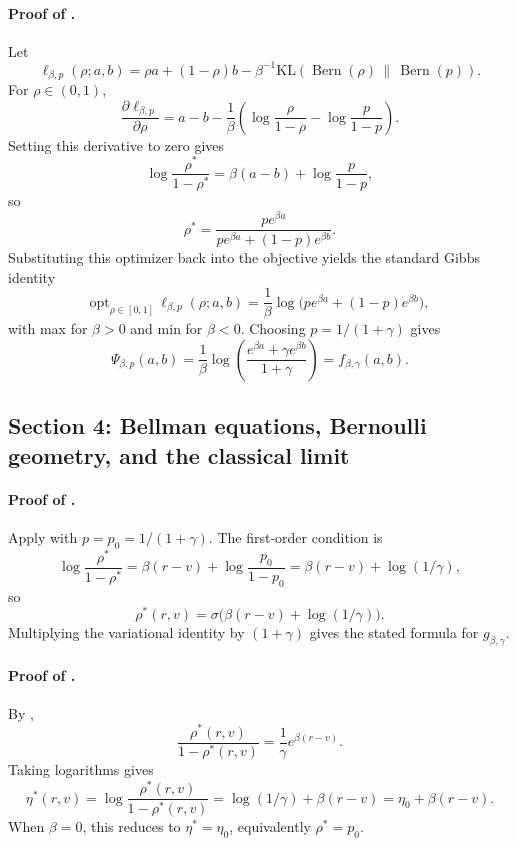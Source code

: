 \documentclass{article}
\theoremstyle{remark}
\DeclareMathOperator{\Bern}{Bern}
\newcommand{\KL}{\mathrm{KL}}
\newcommand{\pprior}{p_0}
\begin{document}
\paragraph{Proof of .}
Let
\[
\ell_{\beta,p}(\rho;a,b)=\rho a +(1-\rho)b-\beta^{-1}\KL\!\left(\Bern(\rho)\,\middle\|\,\Bern(p)\right).
\]
For $\rho\in(0,1)$,
\[
\frac{\partial \ell_{\beta,p}}{\partial \rho}
=a-b-\frac{1}{\beta}\left(\log\frac{\rho}{1-\rho}-\log\frac{p}{1-p}\right).
\]
Setting this derivative to zero gives
\[
\log\frac{\rho^*}{1-\rho^*}=\beta(a-b)+\log\frac{p}{1-p},
\]
so
\[
\rho^*=\frac{pe^{\beta a}}{pe^{\beta a}+(1-p)e^{\beta b}}.
\]
Substituting this optimizer back into the objective yields the standard Gibbs identity
\[
\mathrm{opt}_{\rho\in[0,1]}\,\ell_{\beta,p}(\rho;a,b)
=\frac{1}{\beta}\log\bigl(pe^{\beta a}+(1-p)e^{\beta b}\bigr),
\]
with \textnormal{max} for $\beta>0$ and \textnormal{min} for $\beta<0$.
Choosing $p=1/(1+\gamma)$ gives
\[
\Psi_{\beta,p}(a,b)=\frac{1}{\beta}\log\!\left(\frac{e^{\beta a}+\gamma e^{\beta b}}{1+\gamma}\right)=f_{\beta,\gamma}(a,b).
\]

\subsection{Section 4: Bellman equations, Bernoulli geometry, and the classical limit}
\label{app:bellman}

\paragraph{Proof of .}
Apply  with $p=\pprior=1/(1+\gamma)$.
The first-order condition is
\[
\log\frac{\rho^*}{1-\rho^*}=\beta(r-v)+\log\frac{\pprior}{1-\pprior}=\beta(r-v)+\log(1/\gamma),
\]
so
\[
\rho^*(r,v)=\sigma\!\bigl(\beta(r-v)+\log(1/\gamma)\bigr).
\]
Multiplying the variational identity by $(1+\gamma)$ gives the stated formula for $g_{\beta,\gamma}$.

\paragraph{Proof of .}
By ,
\[
\frac{\rho^*(r,v)}{1-\rho^*(r,v)}
=
\frac{1}{\gamma}e^{\beta(r-v)}.
\]
Taking logarithms gives
\[
\eta^*(r,v)
=
\log\frac{\rho^*(r,v)}{1-\rho^*(r,v)}
=
\log(1/\gamma)+\beta(r-v)
=
\eta_0+\beta(r-v).
\]
When $\beta=0$, this reduces to $\eta^*=\eta_0$, equivalently $\rho^*=\pprior$.
\end{document}
